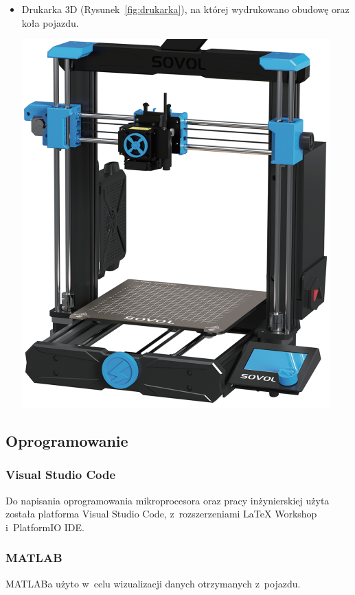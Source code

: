 \begin{itemize}
    \item Drukarka 3D (Rysunek~\ref{fig:drukarka}), na której wydrukowano obudowę oraz koła pojazdu.
    \begin{center}
        \includegraphics[scale=0.5]{images/printer.png}
        \label{fig:drukarka}
    \end{center}
\end{itemize}

\subsection*{Oprogramowanie}

\subsubsection*{Visual Studio Code}
Do napisania oprogramowania mikroprocesora oraz pracy inżynierskiej użyta została platforma Visual Studio Code, z~rozszerzeniami LaTeX Workshop i~PlatformIO IDE.

\subsubsection*{MATLAB}
MATLABa użyto w~celu wizualizacji danych otrzymanych z~pojazdu.

